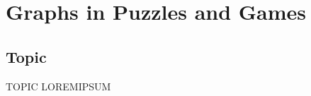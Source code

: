 
\newcommand{\laClass}       {CS 211}
\newcommand{\laSemester}    {Spring 2018}
\newcommand{\laChapter}     {7.5}
\newcommand{\laType}        {Exercise}
\newcommand{\laPoints}      {5}
\newcommand{\laTitle}       {Graphs in Puzzles and Games}
\newcommand{\laDate}        {}
\setcounter{chapter}{7}
\setcounter{section}{5}
\addtocounter{section}{-1}

\toggletrue{answerkey}
\togglefalse{answerkey}





    \section{\laTitle}

    \subsection{Topic}

    \begin{intro}{TOPIC}
        LOREMIPSUM
    \end{intro}

    \begin{questionNOGRADE}{\thequestion}
        
    \end{questionNOGRADE}


